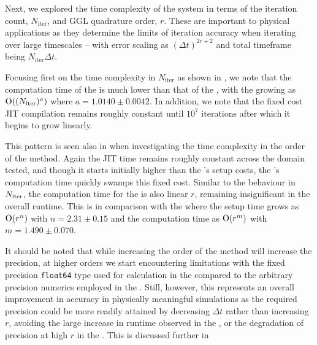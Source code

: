 Next, we explored the time complexity of the system in terms of the iteration count, $N_{\text{iter}}$, and GGL quadrature order, $r$. These are important to physical applications as they determine the limits of iteration accuracy when iterating over large timescales -- with error scaling as $(\Delta t)^{2r + 2}$ and total timeframe being $N_{\text{iter}} \Delta t$.

Focusing first on the time complexity in $N_{\text{iter}}$ as shown in , we note that the computation time of the \updimpl{} is much lower than that of the \orgimpl{}, with the \updimpl{} growing as $\mathord{\mathrm{O}}((N_{\mathrm{iter}})^a)$ where $a = 1.0140 \pm 0.0042$. 
In addition, we note that the fixed cost JIT compilation remains roughly constant until $10^7$ iterations after which it begins to grow linearly.

This pattern is seen also in  when investigating the time complexity in the order of the method. Again the JIT time remains roughly constant across the domain tested, and though it starts initially higher than the \orgimpl{}'s setup costs, the \orgimpl{}'s computation time quickly swamps this fixed cost.
Similar to the behaviour in $N_{\mathrm{iter}}$, the computation time for the \updimpl{} is also linear $r$, remaining insignificant in the overall runtime. This is in comparison with the \orgimpl{} where the setup time grows as $\mathord{\mathrm{O}}(r^n)$ with $n = {2.31 \pm 0.15}$ and the computation time as $\mathord{\mathrm{O}}(r^m)$ with $m={1.490 \pm 0.070}$.

It should be noted that while increasing the order of the method will increase the precision, at higher orders we start encountering limitations with the fixed precision \texttt{float64} type used for calculation in the \updimpl{} compared to the arbitrary precision numerics employed in the \orgimpl{}.
Still, however, this represents an overall improvement in accuracy in physically meaningful simulations as the required precision could be more readily attained by decreasing $\Delta t$ rather than increasing $r$, avoiding the large increase in runtime observed in the \orgimpl{}, or the degradation of precision at high $r$ in the \updimpl{}. This is discussed further in 
